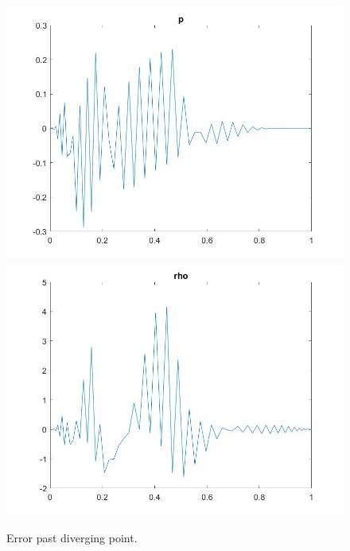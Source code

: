 \documentclass[11pt, a4paper]{article}
\theoremstyle{definition}
\begin{document}
\begin{figure}[h]
	\includegraphics[scale=0.3]{pD1.jpg}
	\includegraphics[scale=0.3]{rD1.jpg}
	\caption{Error past diverging point.}
\end{figure}
\end{document}
